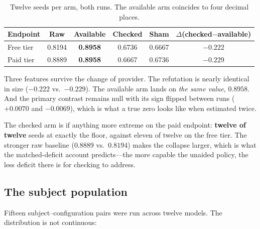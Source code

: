 \documentclass[11pt]{article}
\begin{document}
\begin{table}[h]
\centering
\begin{tabular}{lccccc}
\toprule
Endpoint & Raw & Available & Checked & Sham & $\Delta$(checked$-$available) \\
\midrule
Free tier & 0.8194 & \textbf{0.8958} & 0.6736 & 0.6667 & $\mathbf{-0.222}$ \\
Paid tier & 0.8889 & \textbf{0.8958} & 0.6667 & 0.6736 & $\mathbf{-0.229}$ \\
\bottomrule
\end{tabular}
\caption{Twelve seeds per arm, both runs. The available arm coincides to four
decimal places.}
\end{table}

\noindent
Three features survive the change of provider. The refutation is nearly
identical in size ($-0.222$ vs.\ $-0.229$). The available arm lands on
\emph{the same value}, $0.8958$. And the primary contrast remains null with
its sign flipped between runs ($+0.0070$ and $-0.0069$), which is what a true
zero looks like when estimated twice.

The checked arm is if anything more extreme on the paid endpoint:
\textbf{twelve of twelve} seeds at exactly the floor, against eleven of twelve
on the free tier. The stronger raw baseline ($0.8889$ vs.\ $0.8194$) makes the
collapse larger, which is what the matched-deficit account predicts---the more
capable the unaided policy, the less deficit there is for checking to address.

\subsection{The subject population}
\label{sec:subjects}

Fifteen subject--configuration pairs were run across twelve models. The
distribution is not continuous:
\end{document}
